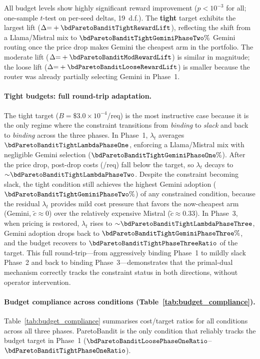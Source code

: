 \noindent
All budget levels show highly significant reward improvement
($p < 10^{-3}$ for all; one-sample $t$-test on per-seed deltas,
19~d.f.).  The \textbf{tight} target exhibits the largest lift
($\Delta{=}+\bdParetoBanditTightRewardLift$), reflecting the shift
from a Llama/Mistral mix to
$\bdParetoBanditTightGeminiPhaseTwo\%$ Gemini routing once the
price drop makes Gemini the cheapest arm in the portfolio.
The moderate lift
($\Delta{=}+\bdParetoBanditModRewardLift$) is similar in magnitude;
the loose lift ($\Delta{=}+\bdParetoBanditLooseRewardLift$) is
smaller because the router was already partially selecting Gemini
in Phase~1.

\paragraph{Tight budgets: full round-trip adaptation.}
The tight target ($B{=}\$3.0{\times}10^{-4}$/req) is the most
instructive case because it is the only regime where the
constraint transitions from \emph{binding} to \emph{slack} and
back to \emph{binding} across the three phases.
In Phase~1, $\lambda_t$ averages
$\bdParetoBanditTightLambdaPhaseOne$, enforcing a Llama/Mistral
mix with negligible Gemini selection
($\bdParetoBanditTightGeminiPhaseOne\%$).
After the price drop, post-drop costs
(\bdParetoBanditTightPhaseTwoCost/req) fall below the target,
so $\lambda_t$ decays to
${\sim}\bdParetoBanditTightLambdaPhaseTwo$.
Despite the constraint becoming slack, the tight condition
still achieves the highest Gemini adoption
($\bdParetoBanditTightGeminiPhaseTwo\%$) of any constrained
condition, because the residual $\lambda_t$ provides mild cost
pressure that favors the now-cheapest arm (Gemini,
$\tilde{c}{\approx}0$) over the relatively expensive Mistral
($\tilde{c}{\approx}0.33$).
In Phase~3, when pricing is restored, $\lambda_t$ rises to
${\sim}\bdParetoBanditTightLambdaPhaseThree$, Gemini adoption
drops back to $\bdParetoBanditTightGeminiPhaseThree\%$, and the
budget recovers to $\bdParetoBanditTightPhaseThreeRatio$ of the
target.
This full round-trip---from aggressively binding Phase~1 to
mildly slack Phase~2 and back to binding Phase~3---demonstrates
that the primal-dual mechanism correctly tracks the constraint
status in both directions, without operator intervention.

\paragraph{Budget compliance across conditions
(Table~\ref{tab:budget_compliance}).}
Table~\ref{tab:budget_compliance} summarises cost/target ratios
for all conditions across all three phases.
ParetoBandit is the only condition that reliably tracks the budget
target in Phase~1 ($\bdParetoBanditLoosePhaseOneRatio$--$\bdParetoBanditTightPhaseOneRatio$).

